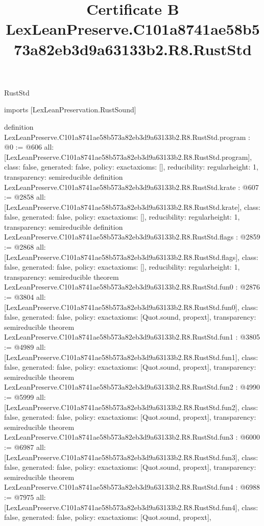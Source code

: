 \begin{lexlean}{RustStd}
\title{Certificate B LexLeanPreserve.C101a8741ae58b573a82eb3d9a63133b2.R8.RustStd}
\begin{coremodule}
imports [LexLeanPreservation.RustSound]

definition LexLeanPreserve.C101a8741ae58b573a82eb3d9a63133b2.R8.RustStd.program : @0 := @606 {
  all: [LexLeanPreserve.C101a8741ae58b573a82eb3d9a63133b2.R8.RustStd.program],
  class: false,
  generated: false,
  policy: exact{axioms: []},
  reducibility: regular{height: 1},
  transparency: semireducible
}
definition LexLeanPreserve.C101a8741ae58b573a82eb3d9a63133b2.R8.RustStd.krate : @607 := @2858 {
  all: [LexLeanPreserve.C101a8741ae58b573a82eb3d9a63133b2.R8.RustStd.krate],
  class: false,
  generated: false,
  policy: exact{axioms: []},
  reducibility: regular{height: 1},
  transparency: semireducible
}
definition LexLeanPreserve.C101a8741ae58b573a82eb3d9a63133b2.R8.RustStd.flags : @2859 := @2868 {
  all: [LexLeanPreserve.C101a8741ae58b573a82eb3d9a63133b2.R8.RustStd.flags],
  class: false,
  generated: false,
  policy: exact{axioms: []},
  reducibility: regular{height: 1},
  transparency: semireducible
}
theorem LexLeanPreserve.C101a8741ae58b573a82eb3d9a63133b2.R8.RustStd.fun0 : @2876 := @3804 {
  all: [LexLeanPreserve.C101a8741ae58b573a82eb3d9a63133b2.R8.RustStd.fun0],
  class: false,
  generated: false,
  policy: exact{axioms: [Quot.sound, propext]},
  transparency: semireducible
}
theorem LexLeanPreserve.C101a8741ae58b573a82eb3d9a63133b2.R8.RustStd.fun1 : @3805 := @4989 {
  all: [LexLeanPreserve.C101a8741ae58b573a82eb3d9a63133b2.R8.RustStd.fun1],
  class: false,
  generated: false,
  policy: exact{axioms: [Quot.sound, propext]},
  transparency: semireducible
}
theorem LexLeanPreserve.C101a8741ae58b573a82eb3d9a63133b2.R8.RustStd.fun2 : @4990 := @5999 {
  all: [LexLeanPreserve.C101a8741ae58b573a82eb3d9a63133b2.R8.RustStd.fun2],
  class: false,
  generated: false,
  policy: exact{axioms: [Quot.sound, propext]},
  transparency: semireducible
}
theorem LexLeanPreserve.C101a8741ae58b573a82eb3d9a63133b2.R8.RustStd.fun3 : @6000 := @6987 {
  all: [LexLeanPreserve.C101a8741ae58b573a82eb3d9a63133b2.R8.RustStd.fun3],
  class: false,
  generated: false,
  policy: exact{axioms: [Quot.sound, propext]},
  transparency: semireducible
}
theorem LexLeanPreserve.C101a8741ae58b573a82eb3d9a63133b2.R8.RustStd.fun4 : @6988 := @7975 {
  all: [LexLeanPreserve.C101a8741ae58b573a82eb3d9a63133b2.R8.RustStd.fun4],
  class: false,
  generated: false,
  policy: exact{axioms: [Quot.sound, propext]},
}
\end{coremodule}
\end{lexlean}
